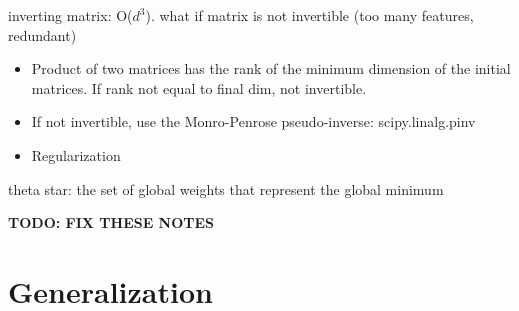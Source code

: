 \documentclass[10pt, oneside]{article}
\begin{document}
inverting matrix: O($d^3$). what if matrix is not invertible (too many features, redundant)
\begin{itemize}
    \item Product of two matrices has the rank of the minimum dimension of the initial matrices. If rank not equal to final dim, not invertible.
    \item If not invertible, use the Monro-Penrose pseudo-inverse: scipy.linalg.pinv
    \item Regularization
\end{itemize}
theta star: the set of global weights that represent the global minimum

\textbf{TODO: FIX THESE NOTES}

\section{Generalization}
\end{document}
